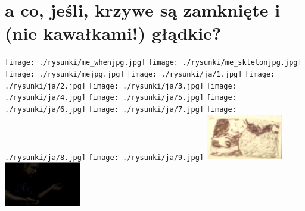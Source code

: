 \documentclass[a4paper, 12pt]{article}
\begin{document}
\section{a co, jeśli, krzywe są zamknięte i (nie kawałkami!) głądkie?}
\texttt{[image: ./rysunki/me\_whenjpg.jpg]}
\texttt{[image: ./rysunki/me\_skletonjpg.jpg]}
\texttt{[image: ./rysunki/mejpg.jpg]}
\texttt{[image: ./rysunki/ja/1.jpg]}
\texttt{[image: ./rysunki/ja/2.jpg]}
\texttt{[image: ./rysunki/ja/3.jpg]}
\texttt{[image: ./rysunki/ja/4.jpg]}
\texttt{[image: ./rysunki/ja/5.jpg]}
\texttt{[image: ./rysunki/ja/6.jpg]}
\texttt{[image: ./rysunki/ja/7.jpg]}
\texttt{[image: ./rysunki/ja/8.jpg]}
\texttt{[image: ./rysunki/ja/9.jpg]}
\includegraphics[width=0.25\textwidth]{./rysunki/fa.png}
\includegraphics[width=0.25\textwidth]{./rysunki/ja/niebiesko.png}
\end{document}
